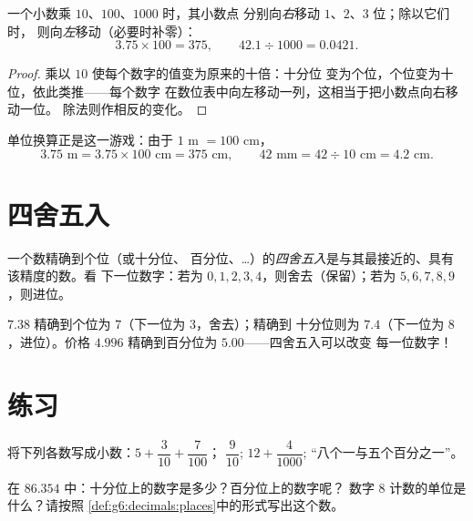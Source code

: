 \begin{proposition}[移动小数点]\label{prop:g6:decimals:shift}
一个小数乘 $10$、$100$、$1000$ 时，其小数点
分别向\emph{右}移动 $1$、$2$、$3$ 位；除以它们时，
则向\emph{左}移动（必要时补零）：
\[
3.75 \times 100 = 375, \qquad
42.1 \div 1000 = 0.0421 .
\]
\end{proposition}

\begin{proof}
乘以 $10$ 使每个数字的值变为原来的十倍：十分位
变为个位，个位变为十位，依此类推——每个数字
在数位表中向左移动一列，这相当于把小数点向右移动一位。
除法则作相反的变化。
\end{proof}

\begin{example}[单位换算]\label{ex:g6:decimals:units}
单位换算正是这一游戏：由于 $1$ m $= 100$ cm，
\[
3.75 \text{ m} = 3.75 \times 100 \text{ cm} = 375 \text{ cm},
\qquad
42 \text{ mm} = 42 \div 10 \text{ cm} = 4.2 \text{ cm}.
\]
\end{example}

\section{四舍五入}

\begin{definition}[四舍五入]\label{def:g6:decimals:rounding}
一个数精确到个位（或十分位、
百分位、\dots）的\emph{四舍五入}是与其最接近的、具有该精度的数。看
下一位数字：若为 $0,1,2,3,4$，则舍去（保留）；若为
$5,6,7,8,9$，则进位。
\end{definition}

\begin{example}
$7.38$ 精确到个位为 $7$（下一位为 $3$，舍去）；精确到
十分位则为 $7.4$（下一位为 $8$，进位）。价格
$4.996$ 精确到百分位为 $5.00$——四舍五入可以改变
每一位数字！
\end{example}

\section{练习}

\begin{exercise}[$\star$]\label{exo:g6:decimals:1}
将下列各数写成小数：$5 + \dfrac{3}{10} + \dfrac{7}{100}$；
\quad $\dfrac{9}{10}$; \quad $12 + \dfrac{4}{1000}$;
\quad “八个一与五个百分之一”。
\end{exercise}

\begin{exercise}[$\star$]\label{exo:g6:decimals:2}
在 $86.354$ 中：十分位上的数字是多少？百分位上的数字呢？
数字 $8$ 计数的单位是什么？请按照
\cref{def:g6:decimals:places}中的形式写出这个数。
\end{exercise}

